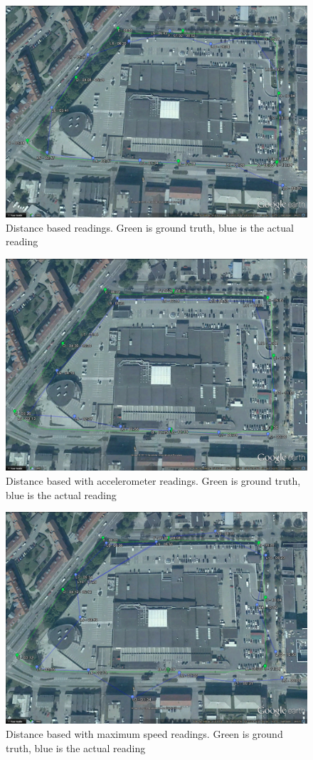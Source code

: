 \begin{figure}[ht]
\includegraphics[scale=0.2]{figures/distanceBRS}
\caption{Distance based readings. Green is ground truth, blue is the actual reading}
\end{figure}

\begin{figure}[ht]
\includegraphics[scale=0.2]{figures/DBRSAccelerometer}
\caption{Distance based with accelerometer readings. Green is ground truth, blue is the actual reading}
\end{figure}

\begin{figure}[ht]
\includegraphics[scale=0.2]{figures/DBRSMaxSpeed}
\caption{Distance based with maximum speed readings. Green is ground truth, blue is the actual reading}
\end{figure}